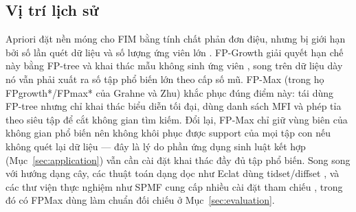 \subsection{Vị trí lịch sử}

Apriori đặt nền móng cho FIM bằng tính chất phản đơn điệu, nhưng bị giới hạn bởi số lần quét dữ liệu và số lượng ứng viên lớn \cite{Agrawal1994FastAlgorithms}. FP-Growth giải quyết hạn chế này bằng FP-tree và khai thác mẫu không sinh ứng viên \cite{Han2000FPGrowth}, song trên dữ liệu dày nó vẫn phải xuất ra số tập phổ biến lớn theo cấp số mũ. FP-Max (trong họ FPgrowth*/FPmax* của Grahne và Zhu) \cite{Grahne2003FPMax} khắc phục đúng điểm này: tái dùng FP-tree nhưng chỉ khai thác biểu diễn tối đại, dùng danh sách MFI và phép tỉa theo siêu tập để cắt không gian tìm kiếm. Đổi lại, FP-Max chỉ giữ vùng biên của không gian phổ biến nên không khôi phục được support của mọi tập con nếu không quét lại dữ liệu --- đây là lý do phần ứng dụng sinh luật kết hợp (Mục~\ref{sec:application}) vẫn cần cài đặt khai thác đầy đủ tập phổ biến. Song song với hướng dạng cây, các thuật toán dạng dọc như Eclat dùng tidset/diffset \cite{Zaki2000Eclat}, và các thư viện thực nghiệm như SPMF cung cấp nhiều cài đặt tham chiếu \cite{FournierViger2014SPMF}, trong đó có FPMax dùng làm chuẩn đối chiếu ở Mục~\ref{sec:evaluation}.
